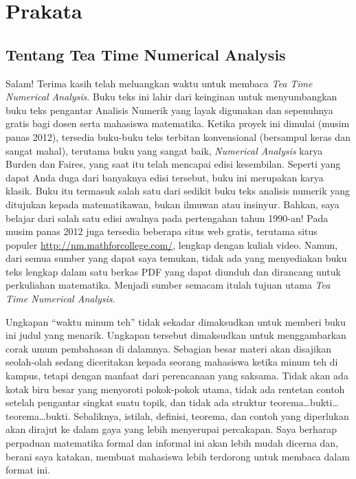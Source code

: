 
\chapter*{Prakata}

\section*{Tentang Tea Time Numerical Analysis}

\fancyhead[LO]{}

Salam! Terima kasih telah meluangkan waktu untuk membaca \textit{Tea
Time Numerical Analysis}. Buku teks ini lahir dari keinginan untuk
menyumbangkan buku teks pengantar Analisis Numerik yang layak digunakan
dan sepenuhnya gratis bagi dosen serta mahasiswa matematika. Ketika
proyek ini dimulai (musim panas 2012), tersedia buku-buku teks terbitan
konvensional (bersampul keras dan sangat mahal), terutama buku yang
sangat baik, \textit{Numerical Analysis} karya Burden dan Faires,
yang saat itu telah mencapai edisi kesembilan. Seperti yang dapat
Anda duga dari banyaknya edisi tersebut, buku ini merupakan karya
klasik. Buku itu termasuk salah satu dari sedikit buku teks analisis
numerik yang ditujukan kepada matematikawan, bukan ilmuwan atau insinyur.
Bahkan, saya belajar dari salah satu edisi awalnya pada pertengahan
tahun 1990-an! Pada musim panas 2012 juga tersedia beberapa situs
web gratis, terutama situs populer \href{http://nm.mathforcollege.com/}{http://nm.mathforcollege.com/},
lengkap dengan kuliah video. Namun, dari semua sumber yang dapat saya
temukan, tidak ada yang menyediakan buku teks lengkap dalam satu berkas
PDF yang dapat diunduh dan dirancang untuk perkuliahan matematika.
Menjadi sumber semacam itulah tujuan utama \textit{Tea Time Numerical
Analysis}.

Ungkapan ``waktu minum teh'' tidak sekadar dimaksudkan untuk memberi
buku ini judul yang menarik. Ungkapan tersebut dimaksudkan untuk menggambarkan
corak umum pembahasan di dalamnya. Sebagian besar materi akan disajikan
seolah-olah sedang diceritakan kepada seorang mahasiswa ketika minum
teh di kampus, tetapi dengan manfaat dari perencanaan yang saksama.
Tidak akan ada kotak biru besar yang menyoroti pokok-pokok utama,
tidak ada rentetan contoh setelah pengantar singkat suatu topik, dan
tidak ada struktur teorema\ldots bukti\ldots teorema\ldots bukti.
Sebaliknya, istilah, definisi, teorema, dan contoh yang diperlukan
akan dirajut ke dalam gaya yang lebih menyerupai percakapan. Saya
berharap perpaduan matematika formal dan informal ini akan lebih mudah
dicerna dan, berani saya katakan, membuat mahasiswa lebih terdorong
untuk membaca dalam format ini. 

